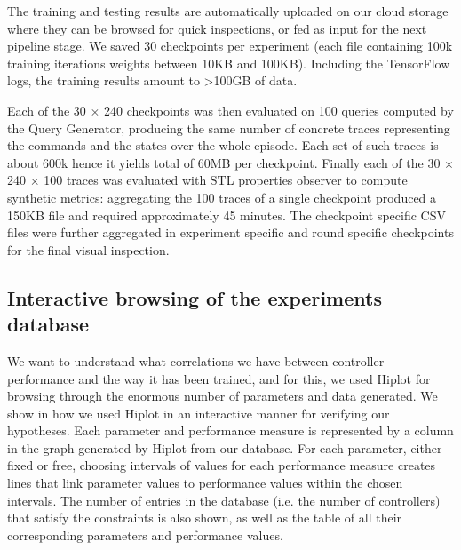 \documentclass[anonymous=true,format=sigconf, screen=true, review=false]{acmart}
\begin{document}
The training and testing results are automatically uploaded on our cloud storage where they can be browsed for quick inspections, or fed as input for the next pipeline stage.
We saved 30 checkpoints per experiment (each file containing 100k training iterations weights between 10KB and 100KB). Including the TensorFlow logs, the training results amount to >100GB of data.

Each of the 30 $\times$ 240 checkpoints was then evaluated on 100 queries computed by the Query Generator, producing the same number of concrete traces representing the commands and the states over the whole episode. Each set of such traces is about 600k hence it yields total of 60MB per checkpoint. %
Finally each of the 30 $\times$ 240 $\times$ 100 traces was evaluated with STL properties observer to compute synthetic metrics: aggregating the 100 traces of a single checkpoint produced a 150KB file and required approximately 45 minutes.
The checkpoint specific CSV files were further aggregated in experiment specific and round specific checkpoints for the final visual inspection.


\subsection{Interactive browsing of the experiments database}


We want to understand what correlations we have between controller performance and the way it has been trained, and for this, we used Hiplot
\cite{hiplot} for browsing through the enormous number of parameters and data generated. 
We show in  how we used Hiplot in an interactive manner for verifying our hypotheses. Each parameter and performance measure is represented by a column in the graph generated by Hiplot from our database. For each parameter, either fixed or free, choosing intervals of values for each performance measure creates lines that link parameter values to performance values within the chosen intervals. The number of entries in the database (i.e. the number of controllers) that satisfy the constraints is also shown, as well as the table of all their corresponding parameters and performance values. 
\end{document}
